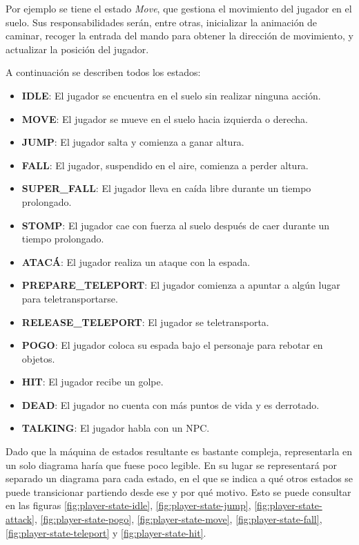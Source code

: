 Por ejemplo se tiene el estado \textit{Move}, que gestiona el movimiento del jugador en el suelo. Sus responsabilidades serán, entre otras, inicializar la animación de caminar, recoger la entrada del mando para obtener la dirección de movimiento, y actualizar la posición del jugador.

A continuación se describen todos los estados:
\begin{itemize}
    \item \textbf{IDLE}: El jugador se encuentra en el suelo sin realizar ninguna acción.
    \item \textbf{MOVE}: El jugador se mueve en el suelo hacia izquierda o derecha.
    \item \textbf{JUMP}: El jugador salta y comienza a ganar altura.
    \item \textbf{FALL}: El jugador, suspendido en el aire, comienza a perder altura.
    \item \textbf{SUPER\_FALL}: El jugador lleva en caída libre durante un tiempo prolongado.
    \item \textbf{STOMP}: El jugador cae con fuerza al suelo después de caer durante un tiempo prolongado.
    \item \textbf{ATACÁ}: El jugador realiza un ataque con la espada.
    \item \textbf{PREPARE\_TELEPORT}: El jugador comienza a apuntar a algún lugar para teletransportarse.
    \item \textbf{RELEASE\_TELEPORT}: El jugador se teletransporta.
    \item \textbf{POGO}: El jugador coloca su espada bajo el personaje para rebotar en objetos.
    \item \textbf{HIT}: El jugador recibe un golpe.
    \item \textbf{DEAD}: El jugador no cuenta con más puntos de vida y es derrotado.
    \item \textbf{TALKING}: El jugador habla con un NPC.
\end{itemize}

Dado que la máquina de estados resultante es bastante compleja, representarla en un solo diagrama haría que fuese poco legible. En su lugar se representará por separado un diagrama para cada estado, en el que se indica a qué otros estados se puede transicionar partiendo desde ese y por qué motivo. Esto se puede consultar en las figuras \ref{fig:player-state-idle}, \ref{fig:player-state-jump}, \ref{fig:player-state-attack}, \ref{fig:player-state-pogo}, \ref{fig:player-state-move}, \ref{fig:player-state-fall}, \ref{fig:player-state-teleport} y \ref{fig:player-state-hit}.

